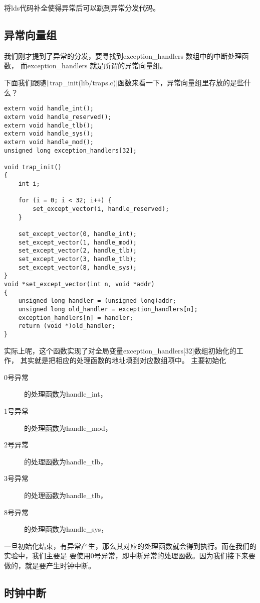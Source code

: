 \begin{exercise}
将lds代码补全使得异常后可以跳到异常分发代码。
\end{exercise}


\subsection{异常向量组}
我们刚才提到了异常的分发，要寻找到exception\_handlers 数组中的中断处理函数，
而exception\_handlers 就是所谓的异常向量组。

下面我们跟随\texttt|trap_init(lib/traps.c)|函数来看一下，异常向量组里存放的是些什么？

\begin{verbatim}
extern void handle_int();
extern void handle_reserved();
extern void handle_tlb();
extern void handle_sys();
extern void handle_mod();
unsigned long exception_handlers[32];

void trap_init()
{
    int i;

    for (i = 0; i < 32; i++) {
        set_except_vector(i, handle_reserved);
    }

    set_except_vector(0, handle_int);
    set_except_vector(1, handle_mod);
    set_except_vector(2, handle_tlb);
    set_except_vector(3, handle_tlb);
    set_except_vector(8, handle_sys);
}
void *set_except_vector(int n, void *addr)
{
    unsigned long handler = (unsigned long)addr;
    unsigned long old_handler = exception_handlers[n];
    exception_handlers[n] = handler;
    return (void *)old_handler;
}

\end{verbatim}

实际上呢，这个函数实现了对全局变量exception\_handlers[32]数组初始化的工作，
其实就是把相应的处理函数的地址填到对应数组项中。
主要初始化
\begin{description}
  \item[0号异常]的处理函数为handle\_int，
  \item[1号异常]的处理函数为handle\_mod，
  \item[2号异常]的处理函数为handle\_tlb，
  \item[3号异常]的处理函数为handle\_tlb，
  \item[8号异常]的处理函数为handle\_sys，
\end{description}
一旦初始化结束，有异常产生，那么其对应的处理函数就会得到执行。而在我们的实验中，我们主要是
要使用0号异常，即中断异常的处理函数。因为我们接下来要做的，就是要产生时钟中断。

\subsection{时钟中断}

